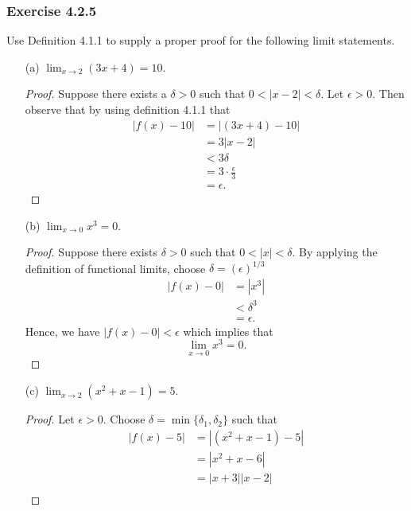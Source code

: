 \subsubsection{Exercise 4.2.5} Use Definition 4.1.1 to supply a proper proof for the following limit statements. 
\begin{enumerate}
    \item[(a)] \( \lim_{ x \to 2 } (3x + 4 ) = 10 \).
        \begin{proof}
        Suppose there exists a \( \delta > 0  \) such that \( 0 < | x - 2  | < \delta \). Let \( \epsilon > 0  \). Then observe that by using definition 4.1.1 that 
        \begin{align*}
            | f(x) - 10 | &= | (3x+4) - 10 |  \\
                          &= 3 | x - 2  | \\
                          &< 3 \delta \\
                          &= 3 \cdot \frac{ \epsilon  }{ 3 }\\
                          &= \epsilon.
        \end{align*}
        \end{proof}
    \item[(b)] \( \lim_{ x \to 0 } x^3 = 0  \).
        \begin{proof}
            Suppose there exists \( \delta > 0  \) such that \( 0 < | x  | < \delta \). By applying the definition of functional limits, choose \( \delta = (\epsilon )^{1/3} \)
        \begin{align*}
            | f(x) - 0  | &= | x^3  |  \\
                          &< \delta^3 \\
                          &= \epsilon.
        \end{align*}
        Hence, we have \( | f(x) - 0  | < \epsilon  \) which implies that 
        \[  \lim_{ x \to 0 } x^3 = 0. \]
        \end{proof}
    \item[(c)] \( \lim_{ x \to 2 } (x^2 + x - 1 ) = 5.  \)
        \begin{proof}
        Let \( \epsilon > 0  \). Choose \( \delta = \min \{ \delta_1, \delta_2  \}  \) such that 
        \begin{align*}
            | f(x)  - 5 | &= | (x^2 + x - 1 ) - 5  |  \\
                          &= | x^2 + x - 6  | \\
                          &= | x + 3  | | x - 2  | \\

\end{align*}
\end{proof}
\end{enumerate}
